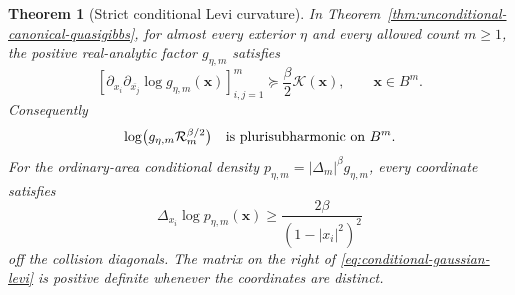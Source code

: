 \documentclass[11pt,a4paper]{article}
\numberwithin{equation}{section}
\newtheorem{theorem}{Theorem}[section]
\theoremstyle{definition}
\theoremstyle{remark}
\begin{document}
\begin{theorem}[Strict conditional Levi curvature]
\label{thm:conditional-gaussian-levi}
In Theorem~\ref{thm:unconditional-canonical-quasigibbs}, for almost
every exterior $\eta$ and every allowed count $m\ge1$, the positive
real-analytic factor $g_{\eta,m}$ satisfies
\begin{equation}\label{eq:conditional-gaussian-levi}
 \left[\partial_{x_i}\partial_{\overline{x_j}}
                \log g_{\eta,m}(\mathbf x)\right]_{i,j=1}^m
       \succeq \frac\beta2\mathcal K(\mathbf x),
       \qquad \mathbf x\in B^m.
\end{equation}
Consequently
\begin{equation}\label{eq:conditional-relative-psh}
 \log\bigl(g_{\eta,m}\mathcal R_m^{\beta/2}\bigr)
 \quad\hbox{is plurisubharmonic on }B^m.
\end{equation}
For the ordinary-area conditional density
$p_{\eta,m}=|\Delta_m|^\beta g_{\eta,m}$, every coordinate satisfies
\begin{equation}\label{eq:conditional-scalar-curvature}
 \Delta_{x_i}\log p_{\eta,m}(\mathbf x)
       \ge \frac{2\beta}{(1-|x_i|^2)^2}
\end{equation}
off the collision diagonals. The matrix on the right of
\eqref{eq:conditional-gaussian-levi} is positive definite whenever
the coordinates are distinct.
\end{theorem}
\end{document}
